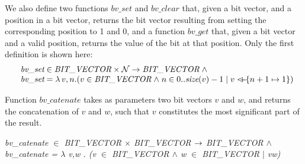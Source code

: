 \documentclass[a4paper]{llncs}
\begin{document}
We also define two functions $\textit{bv\_set}$ and
$\textit{bv\_clear}$ that, given a bit vector, and a position in a
bit vector, returns the bit vector resulting from setting the
corresponding position to 1 and 0, and a function $\textit{bv\_get}$
that, given a bit vector and a valid position, returns the value of
the bit at that position. Only the first definition is shown here:\newline
%
%
%
$$
\hspace*{0.1in}\begin{array}{l}
\textit{bv\_set} \in \textit{BIT\_VECTOR} \times \nat \fun \textit{BIT\_VECTOR} \land \\
 \textit{bv\_set} = \lambda v, n . (v \in \textit{BIT\_VECTOR} \land n \in   0..\textit{size}(v)-1
  \mid v \lover \{n+1 \mapsto 1\})
\end{array}
$$

Function $bv\_catenate$ takes as parameters two bit vectors $v$ and
$w$, and returns the concatenation of $v$ and $w$, such
that $v$ constitutes the most significant part of the result. \newline


\hspace*{-0.0in}\it bv\_catenate  $\in$  \it BIT\_VECTOR  $\times$  \it BIT\_VECTOR  $\rightarrow$ \it
BIT\_VECTOR $\land$\\
\hspace*{0.2in}\it bv\_catenate \rm =  $\lambda$  v\rm ,\it w \rm . \rm (\it v 
$\in$  \it BIT\_VECTOR $\land$ \it w $\in$  \it BIT\_VECTOR  $\mid$  \it v\^ \it w\rm ) %
\newline
\end{document}
